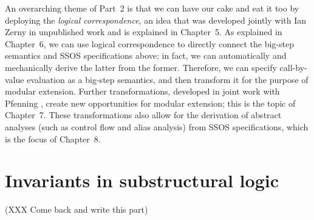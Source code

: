An overarching theme of Part~2 is that we can have our cake and eat it
too by deploying the {\it logical correspondence}, an idea that was
developed jointly with Ian Zerny in unpublished work and is explained
in Chapter~5. As explained in Chapter~6, we can use logical
correspondence to directly connect the big-step semantics and SSOS
specifications above; in fact, we can automatically and mechanically
derive the latter from the former. Therefore, we can specify
call-by-value evaluation as a big-step semantics, and then transform
it for the purpose of modular extension. Further transformations,
developed in joint work with Pfenning \cite{simmons11logical}, create
new opportunities for modular extension; this is the topic of
Chapter~7. These transformations also allow for the derivation of
abstract analyses (such as control flow and alias analysis) from SSOS
specifications, which is the focus of Chapter~8.

\section{Invariants in substructural logic}

(XXX Come back and write this part)

